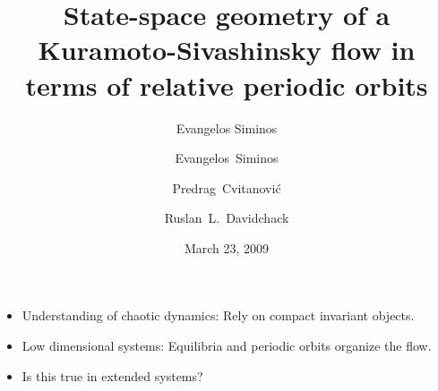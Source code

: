 \documentclass{beamer}
\title{State-space geometry of a Kuramoto-Sivashinsky flow in terms of relative periodic orbits}
\author{Evangelos Siminos}
\author[Siminos, Cvitanovi\'c, Davidchack]
{
  \textcolor{green!50!black}{Evangelos~Siminos}\inst{1} \and
  {Predrag~Cvitanovi\'c}\inst{1} \and
  {Ruslan~L.~Davidchack}\inst{2}
}
\institute
{
  \inst{1}%
  Georgia Institute of Technology
  \and
  \vskip-2mm
  \inst{2}%
  University of Leicester, United Kingdom
}
\date{March 23, 2009}
\begin{document}
\begin{frame}
  \titlepage
\end{frame}



\begin{frame}{}
 \begin{itemize}
  \item Understanding of chaotic dynamics: Rely on compact invariant objects.
  \item Low dimensional systems: Equilibria and periodic orbits organize the flow.
  \item Is this true in extended systems?
 \end{itemize}

\end{frame}
\end{document}
